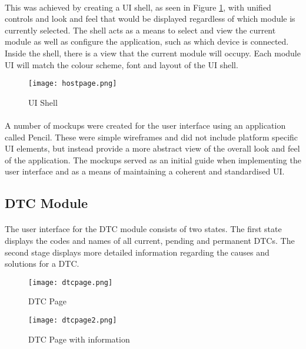	\paragraph{}{
	This was achieved by creating a UI shell, as seen in Figure \ref{fig:UIShell}, with unified controls and look and feel that would be displayed regardless of which module is currently selected. The shell acts as a means to select and view the current module as well as configure the application, such as which device is connected. Inside the shell, there is a view that the current module will occupy. Each module UI will match the colour scheme, font and layout of the UI shell.
	}
	
	\begin{figure}[h]
		\begin{center}
			\texttt{[image: hostpage.png]}
			\caption{UI Shell}
			\label{fig:UIShell}
		\end{center}
	\end{figure}	
	\newpage
	\paragraph{}{
	A number of mockups were created for the user interface using an application called Pencil. These were simple wireframes and did not include platform specific UI elements, but instead provide a more abstract view of the overall look and feel of the application. The mockups served as an initial guide when implementing the user interface and as a means of maintaining a coherent and standardised UI. 
	}
	
	\subsection{DTC Module}
		\paragraph{}{						
		The user interface for the DTC module consists of two states. The first state displays the codes and names of all current, pending and permanent DTCs. The second stage displays more detailed information regarding the causes and solutions for a DTC.
		}
		
		\begin{figure}[h]
			\begin{center}								
				\begin{minipage}{0.49\textwidth}
					\texttt{[image: dtcpage.png]}
					\caption{DTC Page}						
					\label{fig:DTCPage1}
				\end{minipage}
				\hfill			
				\begin{minipage}{0.49\textwidth}
					\texttt{[image: dtcpage2.png]}
					\caption{DTC Page with information}						
					\label{fig:DTCPage2}
				\end{minipage}									
			\end{center}
		\end{figure}
		
